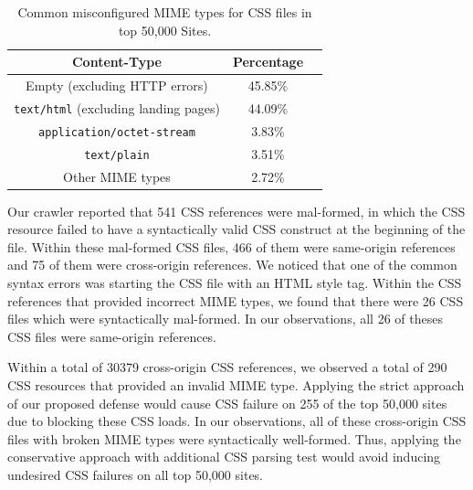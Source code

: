 \documentclass{acm_proc_article-sp}
\begin{document}
\begin{table}
\centering
\begin{tabular}{|c|c|c|} \hline
Content-Type&Percentage\\ \hline
Empty (excluding HTTP errors)&45.85\%\\ \hline
\texttt{text/html} (excluding landing pages)&44.09\%\\ \hline
\texttt{application/octet-stream}&3.83\%\\ \hline
\texttt{text/plain}&3.51\%\\ \hline
Other MIME types&2.72\%\\
\hline\end{tabular}
\caption{Common misconfigured MIME types for CSS files in top 50,000 Sites.}
\label{table:MIME}
\end{table}

Our crawler reported that 541 CSS references were mal-formed, in which the CSS resource failed to have a syntactically valid CSS construct at the beginning of the file. Within these mal-formed CSS files, 466 of them were same-origin references and 75 of them were cross-origin references. We noticed that one of the common syntax errors was starting the CSS file with an HTML style tag. Within the CSS references that provided incorrect MIME types, we found that there were 26 CSS files which were syntactically mal-formed. In our observations, all 26 of theses CSS files were same-origin references.

Within a total of 30379 cross-origin CSS references, we observed a total of 290 CSS resources that provided an invalid MIME type. Applying the strict approach of our proposed defense would cause CSS failure on 255 of the top 50,000 sites due to blocking these CSS loads. In our observations, all of these cross-origin CSS files with broken MIME types were syntactically well-formed. Thus, applying the conservative approach with additional CSS parsing test would avoid inducing undesired CSS failures on all top 50,000 sites.

\end{document}
